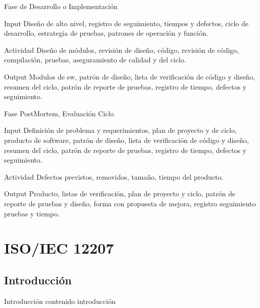 \documentclass[]{beamer}
\begin{document}
			\begin{frame}{Fase de Desarrollo o Implementación}
				\begin{block}{Input}
					Diseño de alto nivel, registro de seguimiento, tiempos y defectos, ciclo de desarrollo, estrategia de pruebas, patrones de operación y función.
				\end{block}
				\begin{block}{Actividad}
					Diseño de módulos, revisión de diseño, código, revisión de código, compilación, pruebas, aseguramiento de calidad y del ciclo.
				\end{block}
				\begin{block}{Output}
					Modulos de sw, patrón de diseño, lista de verificación de código y diseño, resumen del ciclo, patrón de reporte de pruebas, registro de tiempo, defectos y seguimiento.
				\end{block}
			\end{frame}			
			
			\begin{frame}{Fase PostMortem, Evaluación Ciclo}
				\begin{block}{Input}
					Definición de problema y requerimientos, plan de proyecto y de ciclo, producto de software, patrón de diseño, lista de verificación de código y diseño, resumen del ciclo, patrón de reporte de pruebas, registro de tiempo, defectos y seguimiento.
				\end{block}
				\begin{block}{Actividad}
					Defectos previstos, removidos, tamaño, tiempo del producto.
				\end{block}
				\begin{block}{Output}
					Producto, listas de verificación, plan de proyecto y ciclo, patrón de reporte de pruebas y diseño, forma con propuesta de mejora, registro seguimiento pruebas y tiempo.
				\end{block}
			\end{frame}					
			
\section{ISO/IEC 12207}
		\subsection{Introducci\'on}
			\begin{frame}{Introducci\'on}
				contenido introducción
			\end{frame}
		
\end{document}
